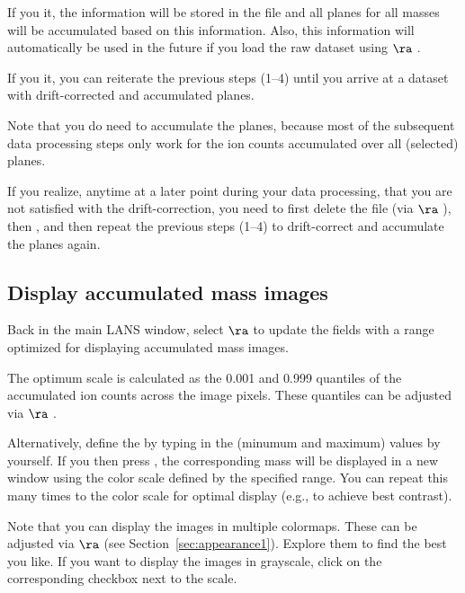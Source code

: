 \bul If you  it, the information will be stored in the file  and all planes for all masses will be accumulated based on this information. Also, this information will automatically be used in the future if you load the raw dataset using  $\ra$ .

\bul If you  it, you can reiterate the previous steps (1--4) until you arrive at a dataset with drift-corrected and accumulated planes.

\bul Note that you do need to accumulate the planes, because most of the subsequent data processing steps only work for the ion counts accumulated over all (selected) planes.

\bul If you realize, anytime at a later point during your data processing, that you are not satisfied with the drift-correction, you need to first delete the  file (via  $\ra$ ), then , and then repeat the previous steps (1--4) to drift-correct and accumulate the planes again.


\subsection{Display accumulated mass images}
\setcounter{step}{0}

\s Back in the main LANS window, select  $\ra$  to update the  fields with a range optimized for displaying accumulated mass images. 

\bul The optimum scale is calculated as the 0.001 and 0.999 quantiles of the accumulated ion counts across the image pixels. These quantiles can be adjusted via  $\ra$ .

\s Alternatively, define the   by typing in the  (minumum and maximum) values by yourself. If you then press , the corresponding mass will be displayed in a new window using the color scale defined by the specified range. You can repeat this many times to  the color scale for optimal display (e.g., to achieve best contrast).

\bul Note that you can display the images in multiple colormaps. These can be adjusted via  $\ra$  (see Section~\ref{sec:appearance1}). Explore them to find the best you like. If you want to display the images in grayscale, click on the corresponding  checkbox next to the scale.

